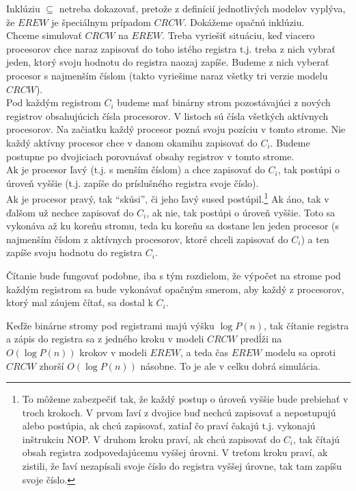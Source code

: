\begin{dokaz}
  Inklúziu $\subseteq$ netreba dokazovať, pretože z definícií
  jednotlivých modelov vyplýva, že $EREW$ je špeciálnym prípadom
  $CRCW$. Dokážeme opačnú inklúziu.
  \\ Chceme simulovať $CRCW$ na $EREW$. Treba vyriešiť
  situáciu, keď viacero procesorov chce naraz zapisovať do toho
  istého registra t.j. treba z nich vybrať jeden, ktorý svoju
  hodnotu do registra naozaj zapíše. Budeme z nich vyberať procesor
  s najmenším číslom (takto vyriešime naraz všetky tri verzie modelu
  $CRCW$).
  \\ Pod každým registrom $C_i$ budeme mať binárny strom
  pozostávajúci z nových registrov obsahujúcich čísla procesorov. V
  listoch sú čísla všetkých aktívnych procesorov. Na začiatku každý
  procesor pozná svoju pozíciu v tomto strome. Nie každý aktívny
  procesor chce v danom okamihu zapisovať do $C_i$. Budeme postupne
  po dvojiciach porovnávať obsahy registrov v tomto strome.
  \\ Ak je procesor ľavý (t.j. s menším číslom) a chce zapisovať do $C_i$,
  tak postúpi o úroveň vyššie (t.j. zapíše do príslušného registra
  svoje číslo).
  \\ Ak je procesor pravý, tak ``skúsi'', či jeho ľavý sused
  postúpil.\footnote{To môžeme zabezpečiť tak, že každý postup o
  úroveň vyššie bude prebiehať v troch krokoch. V prvom ľaví z
  dvojice buď nechcú zapisovať a nepostupujú alebo postúpia, ak chcú
  zapisovať, zatiaľ čo praví čakajú t.j. vykonajú inštrukciu NOP. V
  druhom kroku praví, ak chcú zapisovať do $C_i$, tak čítajú obsah
  registra zodpovedajúcemu vyššej úrovni. V treťom kroku praví, ak
  zistili, že ľaví nezapísali svoje číslo do registra vyššej úrovne,
  tak tam zapíšu svoje číslo.} Ak áno, tak v ďalšom už nechce
  zapisovať do $C_i$, ak nie, tak postúpi o úroveň vyššie. Toto sa
  vykonáva až ku koreňu stromu, teda ku koreňu sa dostane len jeden
  procesor (s najmenším číslom z aktívnych procesorov, ktoré chceli
  zapisovať do $C_i$) a ten zapíše svoju hodnotu do registra $C_i$.

  Čítanie bude fungovať podobne, iba s tým rozdielom, že výpočet na
  strome pod každým registrom sa bude vykonávať opačným smerom, aby
  každý z procesorov, ktorý mal záujem čítať, sa dostal k $C_i$.

  Keďže binárne stromy pod registrami majú výšku $\log P(n)$, tak
  čítanie registra a zápis do registra sa z jedného kroku v modeli
  $CRCW$ predĺži na $O(\log P(n))$ krokov v modeli $EREW$, a teda
  čas $EREW$ modelu sa oproti $CRCW$ zhorší $O(\log P(n))$ násobne.
  To je ale v celku dobrá simulácia.
\end{dokaz}

